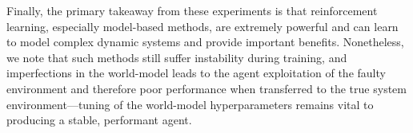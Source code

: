Finally, the primary takeaway from these experiments is that reinforcement learning, especially model-based methods, are extremely powerful and can learn to model complex dynamic systems and provide important benefits. Nonetheless, we note that such methods still suffer instability during training, and imperfections in the world-model leads to the agent exploitation of the faulty environment and therefore poor performance when transferred to the true system environment---tuning of the world-model hyperparameters remains vital to producing a stable, performant agent. 



